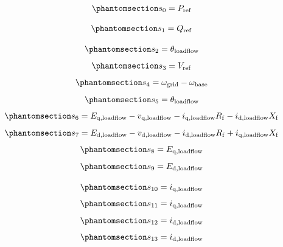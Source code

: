 \documentclass[
  a4paper,
  DIV=11,
  numbers=noendperiod]{scrartcl}
\begin{document}
\begin{equation}\phantomsection\label{eq-s0}{
s_0 = P_\mathrm{ref}
}\end{equation}

\begin{equation}\phantomsection\label{eq-s1}{
s_1 = Q_\mathrm{ref}
}\end{equation}

\begin{equation}\phantomsection\label{eq-s2}{ 
s_2 = \theta_\mathrm{loadflow} 
}\end{equation} \begin{equation}\phantomsection\label{eq-s3}{ 
s_3 = V_\mathrm{ref}
}\end{equation} \begin{equation}\phantomsection\label{eq-s4}{ 
s_4 = \omega_\mathrm{grid} - \omega_\mathrm{base}
}\end{equation} \begin{equation}\phantomsection\label{eq-s5}{ 
s_5 = \theta_\mathrm{loadflow} 
}\end{equation} \begin{equation}\phantomsection\label{eq-s6}{ 
s_6 = E_\mathrm{q,loadflow} - v_\mathrm{q,loadflow} - i_\mathrm{q,loadflow}R_\mathrm{f} - i_\mathrm{d,loadflow}X_\mathrm{f}
}\end{equation} \begin{equation}\phantomsection\label{eq-s7}{ 
s_7 = E_\mathrm{d,loadflow} - v_\mathrm{d,loadflow} - i_\mathrm{d,loadflow}R_\mathrm{f} + i_\mathrm{q,loadflow}X_\mathrm{f}
}\end{equation} \begin{equation}\phantomsection\label{eq-s8}{ 
s_8 = E_\mathrm{q,loadflow} 
}\end{equation} \begin{equation}\phantomsection\label{eq-s9}{ 
s_9 = E_\mathrm{d,loadflow} 
}\end{equation}

\begin{equation}\phantomsection\label{eq-s10}{ 
s_{10} = i_\mathrm{q,loadflow} 
}\end{equation} \begin{equation}\phantomsection\label{eq-s11}{ 
s_{11} = i_\mathrm{q,loadflow} 
}\end{equation} \begin{equation}\phantomsection\label{eq-s12}{ 
s_{12} = i_\mathrm{d,loadflow}  
}\end{equation} \begin{equation}\phantomsection\label{eq-s13}{ 
s_{13} = i_\mathrm{d,loadflow} 
}\end{equation}
\end{document}
